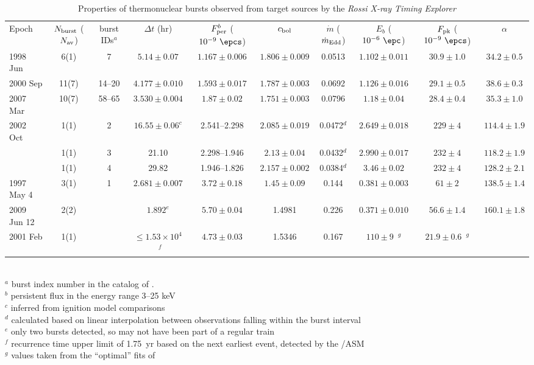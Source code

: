\begin{table*}[h]
\caption{Properties of thermonuclear bursts observed from target sources by
the {\it Rossi X-ray Timing Explorer}}\label{tab:bursts}
\begin{tabular}{lccccccccc}
Epoch & $N_{\rm burst}$ ($N_{\rm av}$) & burst IDs$^a$ & $\Delta t$ (hr) & $F_{\rm per}^b$ ($10^{-9}\ \epcs$) & $c_{\rm bol}$  & $\dot{m}$ ($\dot{m}_{\rm Edd}$) & $E_b$ ($10^{-6}\ \epc$) & $F_{\rm pk}$ ($10^{-9}\ \epcs$) & $\alpha$ \\
1998 Jun & 6(1) & 7 & $5.14\pm0.07$ & $1.167\pm0.006$ & $1.806\pm0.009$ & 0.0513 & $1.102\pm0.011$ & $30.9\pm1.0$ & $34.2\pm0.5$ \\ 
2000 Sep & 11(7) & 14--20 & $4.177\pm0.010$ & $1.593\pm0.017$ & $1.787\pm0.003$ & 0.0692 & $1.126\pm0.016$ & $29.1\pm0.5$ & $38.6\pm0.3$ \\ 
2007 Mar & 10(7) & 58--65 & $3.530\pm0.004$ & $1.87\pm0.02$ & $1.751\pm0.003$ & 0.0796 & $1.18\pm0.04$ & $28.4\pm0.4$ & $35.3\pm1.0$ \\ 
2002 Oct & 1(1) & 2 & $16.55\pm0.06^c$ & 2.541--2.298 & $2.085\pm 0.019$ & 0.0472$^d$ & $2.649\pm0.018$ & $229\pm4$ & $114.4\pm1.9$ \\ 
         & 1(1) & 3 & 21.10 & 2.298--1.946 & $2.13\pm0.04$ & 0.0432$^d$ & $2.990\pm0.017$ & $232\pm4$ & $118.2\pm1.9$ \\ 
         & 1(1) & 4 & 29.82 & 1.946--1.826 & $2.157\pm0.002$ & 0.0384$^d$ & $3.46\pm0.02$ & $232\pm4$ & $128.2\pm2.1$ \\ 
1997 May 4 & 3(1) & 1 & $2.681\pm0.007$ & $3.72\pm0.18$ & $1.45\pm0.09$ & 0.144 & $0.381\pm0.003$ & $61\pm2$ & $138.5\pm1.4$ \\
2009 Jun 12 & 2(2) & & $1.892^e$ & $5.70\pm0.04$ & 1.4981 & 0.226 & $0.371\pm0.010$ & $56.6\pm1.4$ & $160.1\pm1.8$\\ 
2001 Feb & 1(1) & & $\leq 1.53\times10^{4}$~$^f$ & $4.73\pm0.03$ & 1.5346 & 0.167 & $110\pm9$~$^g$ & $21.9\pm0.6$~$^g$ & \\
\hline
\end{tabular}
\medskip\\
$^a$ burst index number in the catalog of \cite{bcatalog}.\\
$^b$ persistent flux in the energy range 3--25 keV \\
$^c$ inferred from ignition model comparisons \\
$^d$ calculated based on linear interpolation between observations falling within the burst interval \\
$^e$ only two bursts detected, so may not have been part of a regular train \\
$^f$ recurrence time upper limit of 1.75~yr based on the next earliest event, detected by the \xte/ASM \cite[]{kuul04} \\
$^g$ values taken from the ``optimal'' fits of \cite{keek14a}

\end{table*}
